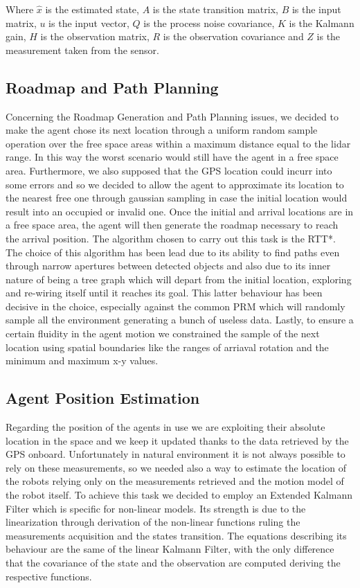 \documentclass[twocolumn, a4paper]{article}
\begin{document}
Where $\hat{x}$ is the estimated state, $A$ is the state transition matrix,
$B$ is the input matrix, $u$ is the input vector, $Q$ is the process noise
covariance, $K$ is the Kalmann gain, $H$ is the observation matrix,
$R$ is the observation covariance and $Z$ is the measurement taken from the
sensor.

\subsection{Roadmap and Path Planning}
Concerning the Roadmap Generation and Path Planning issues, we decided to
make the agent chose its next location through a uniform random sample
operation over the free space areas within a maximum distance equal to the
lidar range. In this way the worst scenario would still have the agent in
a free space area. Furthermore, we also supposed that the GPS location could
incurr into some errors and so we decided to allow the agent to approximate
its location to the nearest free one through gaussian sampling in case the 
initial location would result into an occupied or invalid one. Once the
initial and arrival locations are in a free space area, the agent will then
generate the roadmap necessary to reach the arrival position. The algorithm 
chosen to carry out this task is the RTT*. The choice of this algorithm has
been lead due to its ability to find paths even through narrow apertures
between detected objects and also due to its inner nature of being a tree
graph which will depart from the initial location, exploring and re-wiring
itself until it reaches its goal. This latter behaviour has been decisive in
the choice, especially against the common PRM which will randomly sample all
the environment generating a bunch of useless data. Lastly, to ensure a
certain fluidity in the agent motion we constrained the sample of the
next location using spatial boundaries like the ranges of arriaval rotation and
the minimum and maximum x-y values.

\subsection{Agent Position Estimation}
Regarding the position of the agents in use we are exploiting their absolute
location in the space and we keep it updated thanks to the data retrieved
by the GPS onboard. Unfortunately in natural environment it is not always
possible to rely on these measurements, so we needed also a way to
estimate the location of the robots relying only on the measurements retrieved
and the motion model of the robot itself. To achieve this task we decided
to employ an Extended Kalmann Filter which is specific for non-linear models.
Its strength is due to the linearization through derivation of the non-linear
functions ruling the measurements acquisition and the states transition.
The equations describing its behaviour are the same of the linear Kalmann Filter,
with the only difference that the covariance of the state and the observation
are computed deriving the respective functions.
\end{document}
